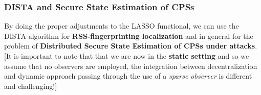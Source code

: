 \hspace*{-5mm}
%

{\color{red}
\subsubsection*{DISTA and Secure State Estimation of CPSs}
}

\noindent
By doing the proper adjustments to the LASSO functional, we can use the DISTA algorithm for \textbf{RSS-fingerprinting localization} and in general for the problem of \textbf{Distributed Secure State Estimation of CPSs under attacks}. [It is important to note that that we are now in the \textbf{static setting} and so we assume that no observers are employed, the integration between decentralization and dynamic approach passing through the use of a \textit{sparse observer} is different and challenging!]  

